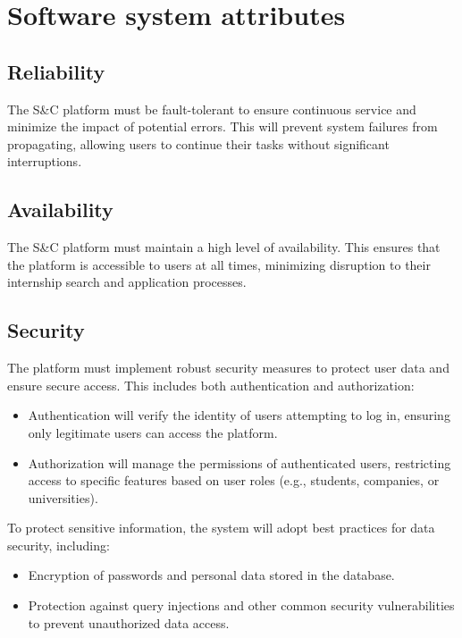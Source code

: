 \section{Software system attributes}
\label{sec:software_system_attributes}%


\subsection{Reliability}
\label{subsec:reliability}%


The S\&C platform must be fault-tolerant to ensure continuous service
and minimize the impact of potential errors. This will prevent system
failures from propagating, allowing users to continue their tasks
without significant interruptions.


\subsection{Availability}
\label{subsec:availability}%


The S\&C platform must maintain a high level of availability. This
ensures that the platform is accessible to users at all times,
minimizing disruption to their internship search and application
processes.~


\subsection{Security}
\label{subsec:security}%


The platform must implement robust security measures to protect user
data and ensure secure access. This includes both authentication and
authorization:

\begin{itemize}
\item
  Authentication will verify the identity of users attempting to log in,
  ensuring only legitimate users can access the platform.
\item
  Authorization will manage the permissions of authenticated users,
  restricting access to specific features based on user roles (e.g.,
  students, companies, or universities).
\end{itemize}

To protect sensitive information, the system will adopt best practices
for data security, including:

\begin{itemize}
\item
  Encryption of passwords and personal data stored in the database.
\item
  Protection against query injections and other common security
  vulnerabilities to prevent unauthorized data access.
\end{itemize}

